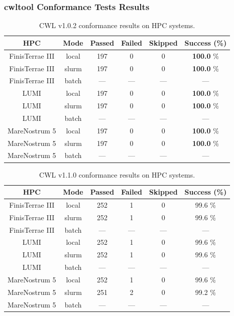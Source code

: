 \documentclass{article}
\begin{document}
\clearpage
\subsubsection*{cwltool Conformance Tests Results}
\begin{table}[ht!]
\centering
\setlength{\tabcolsep}{6pt}
\renewcommand{\arraystretch}{1.2}
\begin{tabular}{|c|c|c|c|c|c|}
\hline
\rowcolor{lightgray!50}
\textbf{HPC} & \textbf{Mode} & \textbf{Passed} & \textbf{Failed} & \textbf{Skipped} & \textbf{Success (\%)} \\
\hline
FinisTerrae III & local & 197 & 0 & 0 & \textbf{100.0} \% \\
FinisTerrae III & slurm & 197 & 0 & 0 & \textbf{100.0} \% \\
FinisTerrae III & batch & — & — & — & — \\
\hline\hline
LUMI & local & 197 & 0 & 0 & \textbf{100.0} \% \\
LUMI & slurm & 197 & 0 & 0 & \textbf{100.0} \% \\
LUMI & batch & — & — & — & — \\
\hline\hline
MareNostrum 5 & local & 197 & 0 & 0 & \textbf{100.0} \% \\
MareNostrum 5 & slurm & 197 & 0 & 0 & \textbf{100.0} \% \\
MareNostrum 5 & batch & — & — & — & — \\
\hline
\end{tabular}
\caption{CWL v1.0.2 conformance results on HPC systems.}
\label{tab:cwltool_v10}
\end{table}
\begin{table}[ht!]
\centering
\setlength{\tabcolsep}{6pt}
\renewcommand{\arraystretch}{1.2}
\begin{tabular}{|c|c|c|c|c|c|}
\hline
\rowcolor{lightgray!50}
\textbf{HPC} & \textbf{Mode} & \textbf{Passed} & \textbf{Failed} & \textbf{Skipped} & \textbf{Success (\%)} \\
\hline
FinisTerrae III & local & 252 & 1 & 0 & 99.6 \% \\
FinisTerrae III & slurm & 252 & 1 & 0 & 99.6 \% \\
FinisTerrae III & batch & — & — & — & — \\
\hline\hline
LUMI & local & 252 & 1 & 0 & 99.6 \% \\
LUMI & slurm & 252 & 1 & 0 & 99.6 \% \\
LUMI & batch & — & — & — & — \\
\hline\hline
MareNostrum 5 & local & 252 & 1 & 0 & 99.6 \% \\
MareNostrum 5 & slurm & 251 & 2 & 0 & 99.2 \% \\
MareNostrum 5 & batch & — & — & — & — \\
\hline
\end{tabular}
\caption{CWL v1.1.0 conformance results on HPC systems.}
\label{tab:cwltool_v11}
\end{table}
\end{document}
